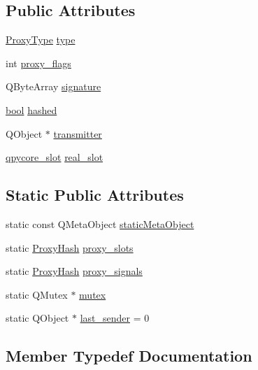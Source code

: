 \subsection*{Public Attributes}
\begin{DoxyCompactItemize}
\item 
\hyperlink{classPyQtProxy_a785c9cec24cf6c5066d38606aec42d19}{Proxy\+Type} \hyperlink{classPyQtProxy_a9d5771a73e4cd9ec2adc51392eb85647}{type}
\item 
int \hyperlink{classPyQtProxy_a6836f5224ff4438e28912d6ccc263255}{proxy\+\_\+flags}
\item 
Q\+Byte\+Array \hyperlink{classPyQtProxy_a403691e985724bd6fd5c4d1d82ee01d0}{signature}
\item 
\hyperlink{compiler_8h_abb452686968e48b67397da5f97445f5b}{bool} \hyperlink{classPyQtProxy_a0f7ad0858576ebabc85dbc5598ba73ac}{hashed}
\item 
Q\+Object $\ast$ \hyperlink{classPyQtProxy_a6f2c3c1d885dc60d5afbe791a4a9f3a1}{transmitter}
\item 
\hyperlink{structqpycore__slot}{qpycore\+\_\+slot} \hyperlink{classPyQtProxy_a647b43db480108a317d80b2c4cc048d2}{real\+\_\+slot}
\end{DoxyCompactItemize}
\subsection*{Static Public Attributes}
\begin{DoxyCompactItemize}
\item 
static const Q\+Meta\+Object \hyperlink{classPyQtProxy_aee9d4c3f3b85c59a12fc42c0c61c06bd}{static\+Meta\+Object}
\item 
static \hyperlink{classPyQtProxy_a85a17352880746150574caab4dafdeb4}{Proxy\+Hash} \hyperlink{classPyQtProxy_a7ee0c7402ddcba89534bf3b7d429d0a5}{proxy\+\_\+slots}
\item 
static \hyperlink{classPyQtProxy_a85a17352880746150574caab4dafdeb4}{Proxy\+Hash} \hyperlink{classPyQtProxy_a6af53d28ba08271c82160e75c28741d2}{proxy\+\_\+signals}
\item 
static Q\+Mutex $\ast$ \hyperlink{classPyQtProxy_af1684e042702f9747e8ceea04d1f8e27}{mutex}
\item 
static Q\+Object $\ast$ \hyperlink{classPyQtProxy_a23300b9e1ebb6fd52e5d720fb046bba6}{last\+\_\+sender} = 0
\end{DoxyCompactItemize}


\subsection{Member Typedef Documentation}
\hypertarget{classPyQtProxy_a85a17352880746150574caab4dafdeb4}{}
